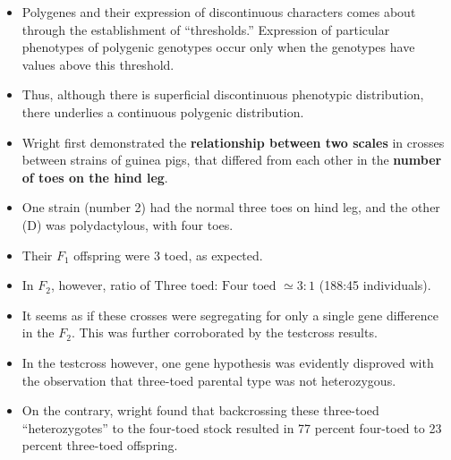 \documentclass[11pt,dvipsnames,ignorenonframetext,aspectratio=169]{beamer}
\providecommand{\tightlist}{%
  \setlength{\itemsep}{0pt}\setlength{\parskip}{0pt}}
\begin{document}
\begin{frame}{}
\protect\hypertarget{section-6}{}

\begin{itemize}
\tightlist
\item
  Polygenes and their expression of discontinuous characters comes about
  through the establishment of ``thresholds.'' Expression of particular
  phenotypes of polygenic genotypes occur only when the genotypes have
  values above this threshold.
\item
  Thus, although there is superficial discontinuous phenotypic
  distribution, there underlies a continuous polygenic distribution.
\item
  Wright first demonstrated the \textbf{relationship between two scales}
  in crosses between strains of guinea pigs, that differed from each
  other in the \textbf{number of toes on the hind leg}.
\end{itemize}

\end{frame}

\begin{frame}{}
\protect\hypertarget{section-7}{}

\begin{itemize}
\tightlist
\item
  One strain (number 2) had the normal three toes on hind leg, and the
  other (D) was polydactylous, with four toes.
\item
  Their \(F_1\) offspring were 3 toed, as expected.
\item
  In \(F_2\), however, ratio of
  \(\text{Three toed: Four toed } \simeq 3:1\) (188:45 individuals).
\item
  It seems as if these crosses were segregating for only a single gene
  difference in the \(F_2\). This was further corroborated by the
  testcross results.
\item
  In the testcross however, one gene hypothesis was evidently disproved
  with the observation that three-toed parental type was not
  heterozygous.
\item
  On the contrary, wright found that backcrossing these three-toed
  ``heterozygotes'' to the four-toed stock resulted in 77 percent
  four-toed to 23 percent three-toed offspring.
\end{itemize}

\end{frame}
\end{document}
